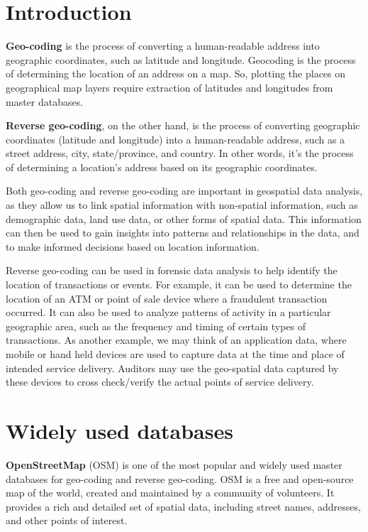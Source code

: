 \documentclass[
]{book}
\begin{document}
\hypertarget{introduction}{%
\section{Introduction}\label{introduction}}

\textbf{Geo-coding} is the process of converting a human-readable address into geographic coordinates, such as latitude and longitude. Geocoding is the process of determining the location of an address on a map. So, plotting the places on geographical map layers require extraction of latitudes and longitudes from master databases.

\textbf{Reverse geo-coding}, on the other hand, is the process of converting geographic coordinates (latitude and longitude) into a human-readable address, such as a street address, city, state/province, and country. In other words, it's the process of determining a location's address based on its geographic coordinates.

Both geo-coding and reverse geo-coding are important in geospatial data analysis, as they allow us to link spatial information with non-spatial information, such as demographic data, land use data, or other forms of spatial data. This information can then be used to gain insights into patterns and relationships in the data, and to make informed decisions based on location information.

Reverse geo-coding can be used in forensic data analysis to help identify the location of transactions or events. For example, it can be used to determine the location of an ATM or point of sale device where a fraudulent transaction occurred. It can also be used to analyze patterns of activity in a particular geographic area, such as the frequency and timing of certain types of transactions. As another example, we may think of an application data, where mobile or hand held devices are used to capture data at the time and place of intended service delivery. Auditors may use the geo-spatial data captured by these devices to cross check/verify the actual points of service delivery.

\hypertarget{widely-used-databases}{%
\section{Widely used databases}\label{widely-used-databases}}

\textbf{OpenStreetMap} (OSM) is one of the most popular and widely used master databases for geo-coding and reverse geo-coding. OSM is a free and open-source map of the world, created and maintained by a community of volunteers. It provides a rich and detailed set of spatial data, including street names, addresses, and other points of interest.
\end{document}
